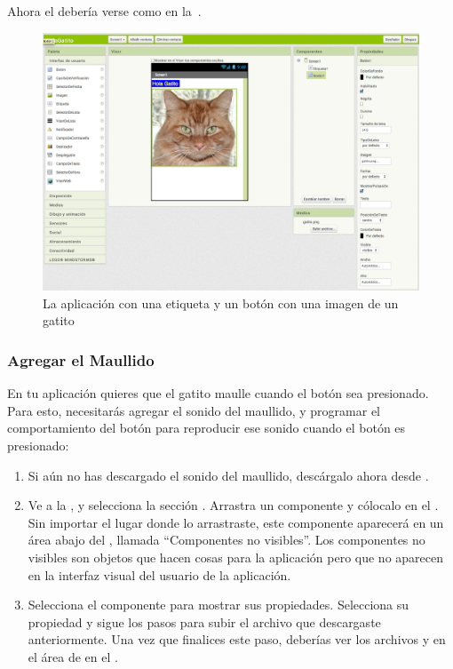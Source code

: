 \documentclass[letterpaper]{article}
\begin{document}
Ahora el \designer debería verse como en
la~.

\begin{figure}[H]
\centering
\includegraphics[scale=0.25]{figures/holaGatitoStep2}
\caption{La aplicación con una etiqueta y un botón con una imagen de
  un gatito}
\label{fig:holaGatitoStep2}
\end{figure}

\subsubsection*{Agregar el Maullido}

En tu aplicación quieres que el gatito maulle cuando el botón sea
presionado. Para esto, necesitarás agregar el sonido del maullido, y
programar el comportamiento del botón para reproducir ese sonido
cuando el botón es presionado:

\begin{enumerate}

\item Si aún no has descargado el sonido del maullido, descárgalo
  ahora desde .

\item Ve a la \palette, y selecciona la sección \media. Arrastra un
  componente  y cólocalo en el \viewer. Sin importar
  el lugar donde lo arrastraste, este componente aparecerá en un área
  abajo del \viewer, llamada ``Componentes no visibles''. Los
  componentes no visibles son objetos que hacen cosas para la
  aplicación pero que no aparecen en la interfaz visual del usuario de
  la aplicación.

\item Selecciona el componente  para mostrar sus
  propiedades. Selecciona su propiedad  y sigue los
  pasos para subir el archivo  que descargaste
  anteriormente. Una vez que finalices este paso, deberías ver los
  archivos  y  en el área de
  \media en el \designer.

\end{enumerate}
\end{document}
